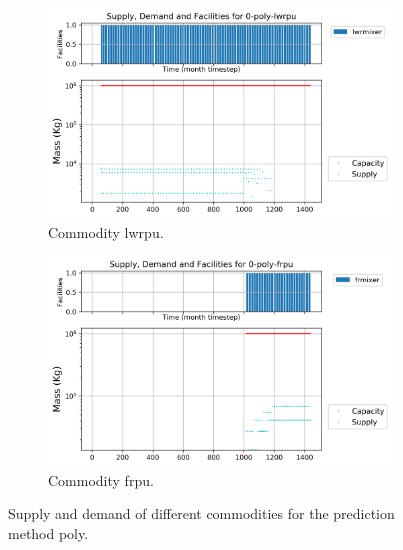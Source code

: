 \documentclass[11pt]{article}
\begin{document}
\begin{figure}[H]
	\centering
	\begin{subfigure}[t]{0.45\textwidth}
		\centering
		\includegraphics[width=\linewidth]{23-figures/0-poly-lwrpu.png} 
		\caption{Commodity lwrpu.}
		\label{fig:23-lwrpu}
	\end{subfigure}
	\vspace{1cm}
	\begin{subfigure}[t]{0.45\textwidth}
		\centering
		\includegraphics[width=\linewidth]{23-figures/0-poly-frpu.png} 
		\caption{Commodity frpu.}
		\label{fig:23-frpu}
	\end{subfigure}
	\hfill
	\caption{Supply and demand of different commodities for the prediction method poly.}
	\label{fig:23-pu}
\end{figure}
\end{document}
